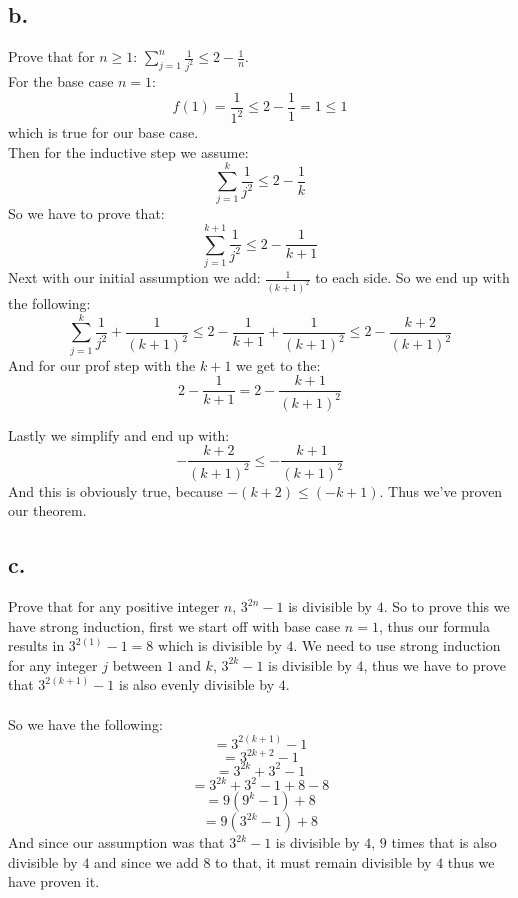 \documentclass[titlepage]{article}\pagestyle{empty}
\begin{document}
\subsection*{b.}
Prove that for $n \geq 1$: $\sum_{j=1}^{n}\frac{1}{j^2}\le2-\frac{1}{n}$.\\
For the base case $n = 1$:\\
\[f(1)=\frac{1}{1^2}\le2-\frac{1}{1}=1\leq 1\]which is true for our base case.\\
Then for the inductive step we assume:
\[\sum_{j=1}^{k}\frac{1}{j^2}\le2-\frac{1}{k}\]So we have to prove that:
\[\sum_{j=1}^{k+1}\frac{1}{j^2}\le2-\frac{1}{k+1}\]
Next with our initial assumption we add: $\frac{1}{(k+1)^2}$ to each side. So we end up with the following:
\[\sum_{j=1}^{k}\frac{1}{j^2}+\frac{1}{{(k+1)}^2}\le2-\frac{1}{k+1}+\frac{1}{{(k+1)}^{2}}\le 2-\frac{k+2}{{(k+1)}^2}\]
And for our prof step with the $k+1$ we get to the:
\[2-\frac{1}{k+1}=2-\frac{k+1}{{(k+1)}^2}\]

Lastly we simplify and end up with:
\[-\frac{k+2}{{(k+1)}^2}\le-\frac{k+1}{{(k+1)}^2}\]
And this is obviously true, because $-(k+2) \leq (-k+1)$. Thus we've proven our theorem.
\pagebreak
\subsection*{c.}
Prove that for any positive integer $n$, $3^{2n}-1$ is divisible by $4$. So to prove this we have strong induction, first we start off with base case $n = 1$, thus our formula results in $3^{2(1)} - 1 = 8$ which is divisible by $4$. We need to use strong induction for any integer $j$ between $1$ and $k$, $3^{2k}-1$ is divisible by $4$, thus we have to prove that $3^{2(k+1)}-1$ is also evenly divisible by $4$.\\~\\
So we have the following:
\[=3^{2(k+1)}-1\]
\[=3^{2k+2}-1\]
\[=3^{2k}+3^2-1\]
\[=3^{2k}+3^2-1+8-8\]
\[=9(9^k-1)+8\]
\[=9(3^{2k}-1)+8\]
And since our assumption was that $3^{2k}-1$ is divisible by $4$, $9$ times that is also divisible by $4$ and since we add $8$ to that, it must remain divisible by $4$ thus we have proven it.
\end{document}
